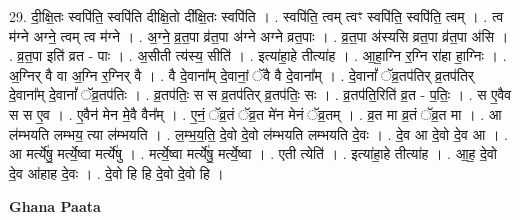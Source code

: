 \documentclass[17pt]{extarticle}
\begin{document}
29. दी॒क्षि॒तः स्वपि॑ति॒ स्वपि॑ति दीक्षि॒तो दी᳚क्षि॒तः स्वपि॑ति । . स्वपि॑ति॒ त्वम् त्वꣳ स्वपि॑ति॒ स्वपि॑ति॒ त्वम् । . त्व म॑ग्ने अग्ने॒ त्वम् त्व म॑ग्ने । . अ॒ग्ने॒ व्र॒त॒पा व्र॑त॒पा अ॑ग्ने अग्ने व्रत॒पाः । . व्र॒त॒पा अ॑स्यसि व्रत॒पा व्र॑त॒पा अ॑सि । . व्र॒त॒पा इति॑ व्रत - पाः । . अ॒सीती त्य॑स्य॒ सीति॑ । . इत्या॑हा॒हे तीत्या॑ह । . आ॒हा॒ग्नि र॒ग्नि रा॑हा हा॒ग्निः । . अ॒ग्निर् वै वा अ॒ग्नि र॒ग्निर् वै । . वै दे॒वाना᳚म् दे॒वानां॒ ॅवै वै दे॒वाना᳚म् । . दे॒वानां᳚ ॅव्र॒तप॑तिर् व्र॒तप॑तिर् दे॒वाना᳚म् दे॒वानां᳚ ॅव्र॒तप॑तिः । . व्र॒तप॑तिः॒ स स व्र॒तप॑तिर् व्र॒तप॑तिः॒ सः । . व्र॒तप॑ति॒रिति॑ व्र॒त - प॒तिः॒ । . स ए॒वैव स स ए॒व । . ए॒वैन॑ मेन मे॒वै वैन᳚म् । . ए॒नं॒ ॅव्र॒तं ॅव्र॒त मे॑न मेनं ॅव्र॒तम् । . व्र॒त मा व्र॒तं ॅव्र॒त मा । . आ ल॑म्भयति लम्भय॒ त्या ल॑म्भयति । . ल॒म्भ॒य॒ति॒ दे॒वो दे॒वो ल॑म्भयति लम्भयति दे॒वः । . दे॒व आ दे॒वो दे॒व आ । . आ मर्त्ये॑षु॒ मर्त्ये॒ष्वा मर्त्ये॑षु । . मर्त्ये॒ष्वा मर्त्ये॑षु॒ मर्त्ये॒ष्वा । . एती त्येति॑ । . इत्या॑हा॒हे तीत्या॑ह । . आ॒ह॒ दे॒वो दे॒व आ॑हाह दे॒वः । . दे॒वो हि हि दे॒वो दे॒वो हि । \newline

\textbf{Ghana Paata } \newline
\end{document}

